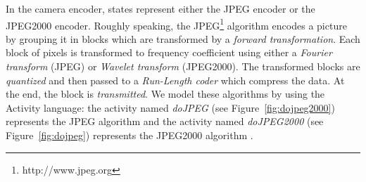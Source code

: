 	
In the camera encoder, states represent either the JPEG encoder or the JPEG2000 encoder. Roughly speaking, the JPEG\footnote{http://www.jpeg.org} algorithm encodes a picture by grouping it in blocks which are transformed by a \textit{forward transformation}. Each block of pixels is transformed to frequency coefficient using either a \textit{Fourier transform} (JPEG) or \textit{Wavelet transform} (JPEG2000). The transformed blocks are \textit{quantized} and then passed to a \textit{Run-Length coder} which compress the data. At the end, the block is \textit{transmitted}. We model these algorithms by using the Activity language: the activity named \emph{doJPEG} (see Figure~\ref{fig:dojpeg2000}) represents the JPEG algorithm and the activity named \emph{doJPEG2000} (see Figure~\ref{fig:dojpeg}) represents the JPEG2000 algorithm . 
	
